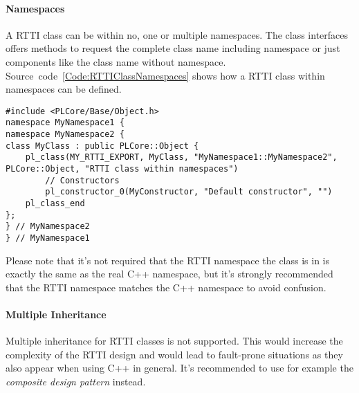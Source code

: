 \paragraph{Namespaces}
A RTTI class can be within no, one or multiple namespaces. The class interfaces offers methods to request the complete class name including namespace or just components like the class name without namespace. Source~code~\ref{Code:RTTIClassNamespaces} shows how a RTTI class within namespaces can be defined.
\begin{lstlisting}[float=htb,label=Code:RTTIClassNamespaces,caption={Using namespaces within the RTTI}]
#include <PLCore/Base/Object.h>
namespace MyNamespace1 {
namespace MyNamespace2 {
class MyClass : public PLCore::Object {
	pl_class(MY_RTTI_EXPORT, MyClass, "MyNamespace1::MyNamespace2", PLCore::Object, "RTTI class within namespaces")
		// Constructors
		pl_constructor_0(MyConstructor, "Default constructor", "")
	pl_class_end
};
} // MyNamespace2
} // MyNamespace1
\end{lstlisting}
Please note that it's not required that the RTTI namespace the class is in is exactly the same as the real C++ namespace, but it's strongly recommended that the RTTI namespace matches the C++ namespace to avoid confusion.


\paragraph{Multiple Inheritance}
Multiple inheritance for RTTI classes is not supported. This would increase the complexity of the RTTI design and would lead to fault-prone situations as they also appear when using C++ in general. It's recommended to use for example the \emph{composite design pattern} instead.


